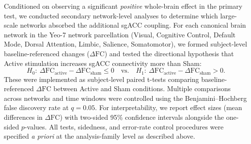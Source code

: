 Conditioned on observing a significant \emph{positive} whole-brain effect in the primary test, we conducted secondary network-level analyses to determine which large-scale networks absorbed the additional sgACC coupling. For each canonical brain network in the Yeo-7 network parcellation \cite{yeo2011organization} (Visual, Cognitive Control, Default Mode, Dorsal Attention, Limbic, Salience, Somatomotor), we formed subject-level baseline-referenced changes ($\Delta\mathrm{FC}$) and tested the directional hypothesis that Active stimulation increases sgACC connectivity more than Sham:
\[
H_0:\ \Delta\mathrm{FC}_{\text{active}} - \Delta\mathrm{FC}_{\text{sham}} \le 0
\quad\text{vs.}\quad
H_1:\ \Delta\mathrm{FC}_{\text{active}} - \Delta\mathrm{FC}_{\text{sham}} > 0.
\]
These were implemented as subject-level paired t-tests comparing baseline-referenced $\Delta\mathrm{FC}$ between Active and Sham conditions. Multiple comparisons across networks and time windows were controlled using the Benjamini–Hochberg false discovery rate at $q=0.05$. For interpretability, we report effect sizes (mean differences in $\Delta\mathrm{FC}$) with two-sided 95\% confidence intervals alongside the one-sided $p$-values. All tests, sidedness, and error-rate control procedures were specified \emph{a priori} at the analysis-family level as described above.

